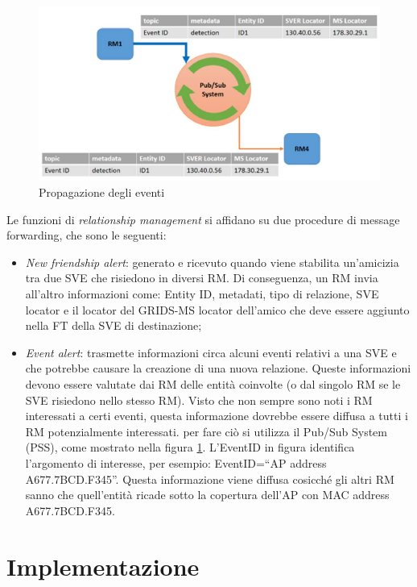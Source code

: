 \begin{figure}[h!t]
\centerline{\includegraphics[scale=0.5]{img/scambiomessaggi}}
\caption{Propagazione degli eventi}
\label{f:grids:scambiomex}
\end{figure}

Le funzioni di \textit{relationship management} si affidano su due procedure di message forwarding, che sono le seguenti:

\begin{itemize}
    \item \textit{New friendship alert}: generato e ricevuto quando viene stabilita un'amicizia tra due SVE che risiedono in diversi RM. Di conseguenza, un RM invia all'altro informazioni come: Entity ID, metadati, tipo di relazione, SVE locator e il locator del GRIDS-MS locator dell'amico che deve essere aggiunto nella FT della SVE di destinazione;
    \item \textit{Event alert}: trasmette informazioni circa alcuni eventi relativi a una SVE e che potrebbe causare la creazione di una nuova relazione. Queste informazioni devono essere valutate dai RM delle entità coinvolte (o dal singolo RM se le SVE risiedono nello stesso RM). Visto che non sempre sono noti i RM interessati a certi eventi, questa informazione dovrebbe essere diffusa a tutti i RM potenzialmente interessati. per fare ciò si utilizza il Pub/Sub System (PSS), come mostrato nella figura \ref{f:grids:scambiomex}. L'EventID in figura identifica l'argomento di interesse, per esempio: EventID=“AP address A677.7BCD.F345”. Questa informazione viene diffusa cosicch\'e gli altri RM sanno che quell'entità ricade sotto la copertura dell'AP con MAC address A677.7BCD.F345.
\end{itemize}

\section{Implementazione}
\label{c:grids:implementation}

